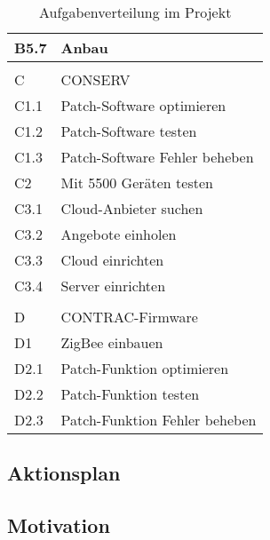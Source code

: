 \begin{table}[H]
\begin{center}
\begin{tabular}{l|l}
            B5.7 & Anbau                                               \\ \hline
            &                                                     \\ \hline
            C    & CONSERV                                             \\ \hline
            C1.1 & Patch-Software optimieren                           \\ \hline
            C1.2 & Patch-Software testen                               \\ \hline
            C1.3 & Patch-Software Fehler beheben                       \\ \hline
            C2   & Mit 5500 Geräten testen                             \\ \hline
            C3.1 & Cloud-Anbieter suchen                               \\ \hline
            C3.2 & Angebote einholen                                   \\ \hline
            C3.3 & Cloud einrichten                                    \\ \hline
            C3.4 & Server einrichten                                   \\ \hline
            &                                                     \\ \hline
            D    & CONTRAC-Firmware                                    \\ \hline
            D1   & ZigBee einbauen                                     \\ \hline
            D2.1 & Patch-Funktion optimieren                           \\ \hline
            D2.2 & Patch-Funktion testen                               \\ \hline
            D2.3 & Patch-Funktion Fehler beheben                       \\
        \end{tabular}
        \caption{Aufgabenverteilung im Projekt}
    \end{center}
\end{table}
\subsection{Aktionsplan}


\subsection{Motivation} %
